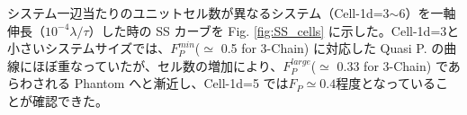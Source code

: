 \documentclass[11pt]{jsarticle}
\makeatletter
\def\subsection{\@startsection{subsection}{2}{\z@}{0.2\Cvs \@plus.5\Cdp \@minus.2\Cdp}{0.1\Cvs \@plus.3\Cdp}{\reset@font\normalsize\bfseries}}
\makeatother
\begin{document}
システム一辺当たりのユニットセル数が異なるシステム（Cell-1d=3$\sim$6）を一軸伸長（$10^{-4}\lambda/\tau$）した時の SS カーブを Fig. \ref{fig:SS_cells} に示した。Cell-1d=3と小さいシステムサイズでは、$F_P^{min}$($\simeq$ 0.5 for 3-Chain) に対応した Quasi P. の曲線にほぼ重なっていたが、セル数の増加により、$F_P^{large}$($\simeq$ 0.33 for 3-Chain) であらわされる Phantom へと漸近し、Cell-1d=5 では$F_P\simeq0.4$程度となっていることが確認できた。

%

\vspace{-3mm}
\end{document}
